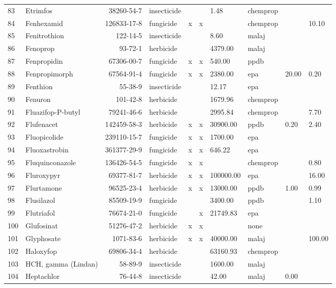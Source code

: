\begin{longtable}{lp{3cm}rlp{0.5cm}p{0.5cm}p{1cm}p{1cm}p{1cm}p{1cm}}
  83 & Etrimfos & 38260-54-7 & insecticide &  &  & 1.48 & chemprop &  &  \\ 
  84 & Fenhexamid & 126833-17-8 & fungicide & x & x &  & chemprop &  & 10.10 \\ 
  85 & Fenitrothion & 122-14-5 & insecticide &  &  & 8.60 & malaj &  &  \\ 
  86 & Fenoprop & 93-72-1 & herbicide &  &  & 4379.00 & malaj &  &  \\ 
  87 & Fenpropidin & 67306-00-7 & fungicide & x & x & 540.00 & ppdb &  &  \\ 
  88 & Fenpropimorph & 67564-91-4 & fungicide & x & x & 2380.00 & epa & 20.00 & 0.20 \\ 
  89 & Fenthion & 55-38-9 & insecticide &  &  & 12.17 & epa &  &  \\ 
  90 & Fenuron & 101-42-8 & herbicide &  &  & 1679.96 & chemprop &  &  \\ 
  91 & Fluazifop-P-butyl & 79241-46-6 & herbicide &  &  & 2995.84 & chemprop &  & 7.70 \\ 
  92 & Flufenacet & 142459-58-3 & herbicide & x & x & 30900.00 & ppdb & 0.20 & 2.40 \\ 
  93 & Fluopicolide & 239110-15-7 & fungicide & x & x & 1700.00 & epa &  &  \\ 
  94 & Fluoxastrobin & 361377-29-9 & fungicide & x & x & 646.22 & epa &  &  \\ 
  95 & Fluquinconazole & 136426-54-5 & fungicide & x & x &  & chemprop &  & 0.80 \\ 
  96 & Fluroxypyr & 69377-81-7 & herbicide & x & x & 100000.00 & epa &  & 16.00 \\ 
  97 & Flurtamone & 96525-23-4 & herbicide & x & x & 13000.00 & ppdb & 1.00 & 0.99 \\ 
  98 & Flusilazol & 85509-19-9 & fungicide &  &  & 3400.00 & ppdb &  & 1.10 \\ 
  99 & Flutriafol & 76674-21-0 & fungicide &  & x & 21749.83 & epa &  &  \\ 
  100 & Glufosinat & 51276-47-2 & herbicide & x & x &  & none &  &  \\ 
  101 & Glyphosate & 1071-83-6 & herbicide & x & x & 40000.00 & malaj &  & 100.00 \\ 
  102 & Haloxyfop & 69806-34-4 & herbicide &  &  & 63160.93 & chemprop &  &  \\ 
  103 & HCH, gamma (Lindan) & 58-89-9 & insecticide &  &  & 1600.00 & malaj &  &  \\ 
  104 & Heptachlor & 76-44-8 & insecticide &  &  & 42.00 & malaj & 0.00 &  \\ 

\end{longtable}
